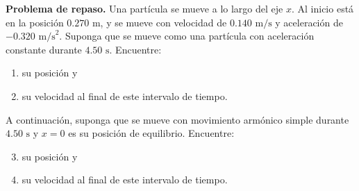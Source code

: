 \item \textbf{Problema de repaso.}
Una partícula se mueve a lo largo del eje $x$. Al inicio está en la posición $0.270\text{ m}$, y se mueve con velocidad de $0.140\text{ m/s}$ y aceleración de $-0.320\text{ m/s}^2$. Suponga que se mueve como una partícula con aceleración constante durante $4.50\text{ s}$. Encuentre:
\begin{enumerate}
    \item su posición y
    \item su velocidad al final de este intervalo de tiempo.
\end{enumerate}
A continuación, suponga que se mueve con movimiento armónico simple durante $4.50\text{ s}$ y $x = 0$ es su posición de equilibrio. Encuentre:
\begin{enumerate}
    \setcounter{enumi}{2}
    \item su posición y
    \item su velocidad al final de este intervalo de tiempo.
\end{enumerate}